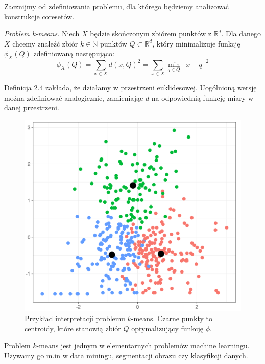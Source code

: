 Zacznijmy od zdefiniowania problemu, dla którego będziemy analizować konstrukcje coresetów.

\begin{definition}
    \emph{Problem k-means.} Niech $X$ będzie skończonym zbiórem punktów z $\mathbb{R}^{d}$. 
    Dla danego $X$ chcemy znaleźć zbiór $k \in \mathbb{N}$ punktów $Q \subset \mathbb{R}^{d}$, który minimalizuje funkcję $\phi_{X}(Q)$ zdefiniowaną następująco:
    \begin{equation}
        \phi_{X}(Q) = \sum_{x \in X} d(x, Q)^{2} = \sum_{x \in X} \min_{q \in Q} || x - q ||^{2} 
    \end{equation}
\end{definition}

\noindent
Definicja 2.4 zakłada, że działamy w przestrzeni euklidesowej.
Uogólnioną wersję można zdefiniować analogicznie, zamieniając $d$ na odpowiednią funkcję miary w danej przestrzeni.

\begin{figure}[H]
    \centering
    \includegraphics[totalheight=5cm]{cluster.png}
    \caption{Przykład interpretacji problemu $k$-means. Czarne punkty to centroidy, które stanowią zbiór $Q$ optymalizujący funkcję $\phi$.}
\end{figure}

\noindent
Problem $k$-means jest jednym w elementarnych problemów machine learningu.
Używamy go m.in w data miningu, segmentacji obrazu czy klasyfikcji danych. 

